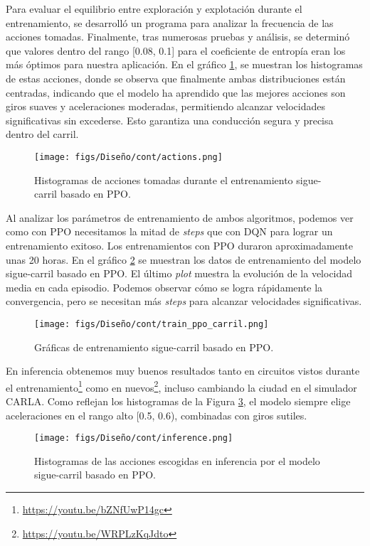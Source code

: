 Para evaluar el equilibrio entre exploración y explotación durante el entrenamiento, se desarrolló un programa para analizar la frecuencia de las acciones tomadas. Finalmente, tras numerosas pruebas y análisis, se determinó que valores dentro del rango [0.08, 0.1] para el coeficiente de entropía eran los más óptimos para nuestra aplicación. En el gráfico \ref{fig:actions_ppo_carril}, se muestran los histogramas de estas acciones, donde se observa que finalmente ambas distribuciones están centradas, indicando que el modelo ha aprendido que las mejores acciones son giros suaves y aceleraciones moderadas, permitiendo alcanzar velocidades significativas sin excederse. Esto garantiza una conducción segura y precisa dentro del carril.

\begin{figure}[ht]
  \centering
  \texttt{[image: figs/Diseño/cont/actions.png]}
  \caption{Histogramas de acciones tomadas durante el entrenamiento sigue-carril basado en \ac{PPO}.}
  \label{fig:actions_ppo_carril}
\end{figure}

\newpage

Al analizar los parámetros de entrenamiento de ambos algoritmos, podemos ver como con \ac{PPO} necesitamos la mitad de \textit{steps} que con \ac{DQN} para lograr un entrenamiento exitoso. Los entrenamientos con \ac{PPO} duraron aproximadamente unas 20 horas. En el gráfico \ref{fig:train_ppo_carril} se muestran los datos de entrenamiento del modelo sigue-carril basado en \ac{PPO}. El último \textit{plot} muestra la evolución de la velocidad media en cada episodio. Podemos observar cómo se logra rápidamente la convergencia, pero se necesitan más \textit{steps} para alcanzar velocidades significativas.
\begin{figure}[ht]
\centering
\texttt{[image: figs/Diseño/cont/train\_ppo\_carril.png]}
\caption{Gráficas de entrenamiento sigue-carril basado en \ac{PPO}.}
\label{fig:train_ppo_carril}
\end{figure}

En inferencia obtenemos muy buenos resultados tanto en circuitos vistos durante el entrenamiento\footnote{\url{https://youtu.be/bZNfUwP14gc}} como en nuevos\footnote{\url{https://youtu.be/WRPLzKqJdto}}, incluso cambiando la ciudad en el simulador CARLA. Como reflejan los histogramas de la Figura \ref{fig:inference_ppo_carril}, el modelo siempre elige aceleraciones en el rango alto [0.5, 0.6), combinadas con giros sutiles.
\begin{figure}[ht]
\centering
\texttt{[image: figs/Diseño/cont/inference.png]}
\caption{Histogramas de las acciones escogidas en inferencia por el modelo sigue-carril basado en \ac{PPO}.}
\label{fig:inference_ppo_carril}
\end{figure} 

